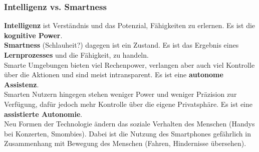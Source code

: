 \documentclass[a4paper]{article}
\begin{document}
\subsubsection{Intelligenz vs. Smartness}
\textbf{Intelligenz} ist Verständnis und das Potenzial, Fähigkeiten zu erlernen. Es ist die \textbf{kognitive Power}.\\
\textbf{Smartness} (Schlauheit?) dagegen ist ein Zustand. Es ist das Ergebnis eines \textbf{Lernprozesses} und die Fähigkeit, zu handeln.\\

Smarte Umgebungen bieten viel Rechenpower, verlangen aber auch viel Kontrolle über die Aktionen und sind meist intransparent. Es ist eine \textbf{autonome Assistenz}.\\
Smarten Nutzern hingegen stehen weniger Power und weniger Präzision zur Verfügung, dafür jedoch mehr Kontrolle über die eigene Privatsphäre. Es ist eine \textbf{assistierte Autonomie}.\\

Neu Formen der Technologie ändern das soziale Verhalten des Menschen (Handys bei Konzerten, Smombies). Dabei ist die Nutzung des Smartphones gefährlich in Zusammenhang mit Bewegung des Menschen (Fahren, Hindernisse übersehen).
\end{document}
